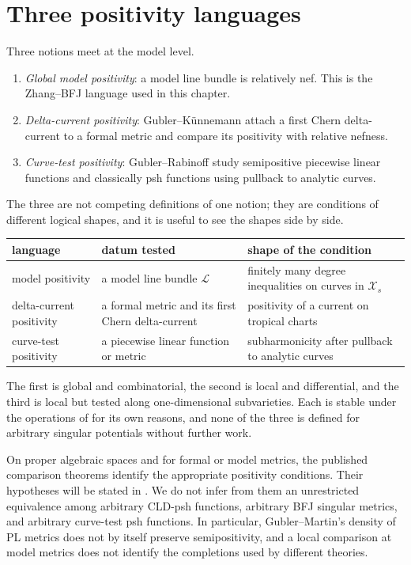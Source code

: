 \section{Three positivity languages}
\label{sec:metrics-positivity-interface}

Three notions meet at the model level.

\begin{enumerate}
\item \emph{Global model positivity}: a model line bundle is relatively nef.
This is the Zhang--BFJ language used in this chapter.
\item \emph{Delta-current positivity}: Gubler--Künnemann attach a first Chern
delta-current to a formal metric and compare its positivity with relative
nefness.
\item \emph{Curve-test positivity}: Gubler--Rabinoff study semipositive
piecewise linear functions and classically psh functions using pullback to
analytic curves.
\end{enumerate}

The three are not competing definitions of one notion; they are conditions
of different logical shapes, and it is useful to see the shapes side by
side.

\medskip
\noindent
\begin{tabular}{@{}p{}p{}p{}@{}}
\toprule
language & datum tested & shape of the condition\\
\midrule
model positivity
 & a model line bundle $\mathcal L$
 & finitely many degree inequalities on curves in $\mathcal X_s$\\
delta-current positivity
 & a formal metric and its first Chern delta-current
 & positivity of a current on tropical charts\\
curve-test positivity
 & a piecewise linear function or metric
 & subharmonicity after pullback to analytic curves\\
\bottomrule
\end{tabular}
\medskip

\noindent The first is global and combinatorial, the second is local and
differential, and the third is local but tested along one-dimensional
subvarieties. Each is stable under the operations of
 for its own reasons, and none of the
three is defined for arbitrary singular potentials without further work.

On proper algebraic spaces and for formal or model metrics, the published
comparison theorems identify the appropriate positivity conditions. Their
hypotheses will be stated in
. We do not infer from them an
unrestricted equivalence among arbitrary CLD-psh functions, arbitrary
BFJ singular metrics, and arbitrary curve-test psh functions. In particular,
Gubler--Martin's density of PL metrics does not by itself preserve
semipositivity, and a local comparison at model metrics does not identify
the completions used by different theories.

